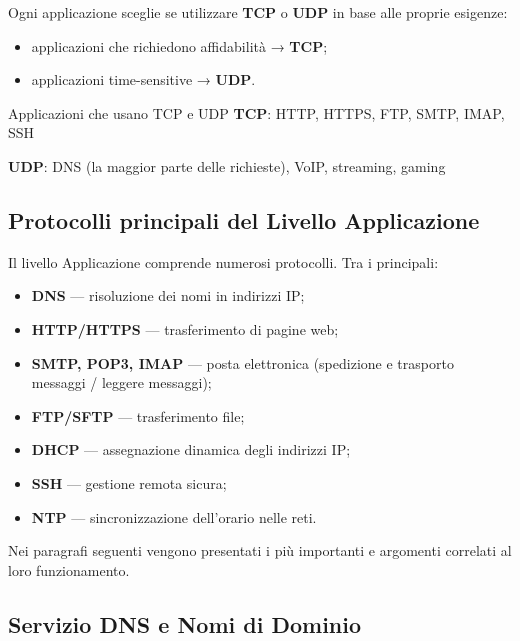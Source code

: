 \documentclass[a4paper,12pt]{report}
\begin{document}
Ogni applicazione sceglie se utilizzare \textbf{TCP} o \textbf{UDP} in base alle
proprie esigenze:
\begin{itemize}
    \item applicazioni che richiedono affidabilità → \textbf{TCP};
    \item applicazioni time-sensitive → \textbf{UDP}.
\end{itemize}

\begin{notebox}{Applicazioni che usano TCP e UDP}
\textbf{TCP}: HTTP, HTTPS, FTP, SMTP, IMAP, SSH  


\textbf{UDP}: DNS (la maggior parte delle richieste), VoIP, streaming, gaming
\end{notebox}

\subsection{Protocolli principali del Livello Applicazione}

Il livello Applicazione comprende numerosi protocolli. Tra i principali:

\begin{itemize}
    \item \textbf{DNS} — risoluzione dei nomi in indirizzi IP;
    \item \textbf{HTTP/HTTPS} — trasferimento di pagine web;
    \item \textbf{SMTP, POP3, IMAP} — posta elettronica (spedizione e trasporto messaggi / leggere messaggi);
    \item \textbf{FTP/SFTP} — trasferimento file;
    \item \textbf{DHCP} — assegnazione dinamica degli indirizzi IP;
    \item \textbf{SSH} — gestione remota sicura;
    \item \textbf{NTP} — sincronizzazione dell’orario nelle reti.
\end{itemize}

Nei paragrafi seguenti vengono presentati i più importanti e argomenti correlati al loro funzionamento.

\newpage

\subsection{Servizio DNS e Nomi di Dominio}
\end{document}
